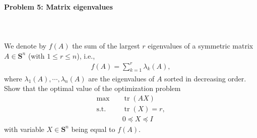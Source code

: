 \documentclass[a4paper]{article}
\newenvironment{solution}
{\color{blue} \paragraph{Solution.}}
{\newline \qed}
\begin{document}


\paragraph{Problem 5: Matrix eigenvalues}
~\\
~\\
We denote by $f(A)$ the sum of the largest $r$ eigenvalues of a symmetric matrix $A \in \mathbf{S}^n$ (with $1 \le r \le n$), i.e., 
\begin{align*}
    f(A) = \sum_{k=1}^r \lambda_k (A),
\end{align*}
where $\lambda_1 (A), \cdots, \lambda_n (A)$ are the eigenvalues of $A$ sorted in decreasing order. Show that the optimal value of the optimization problem
\begin{align*}
    \max \quad & \operatorname{tr} (AX) \\
    \operatorname{s.t.} \quad & \operatorname{tr} (X) = r, \\
    & 0 \preceq X \preceq I
\end{align*}
with variable $X \in \mathbf{S}^n$ being equal to $f(A)$.
~\\



\end{document}
